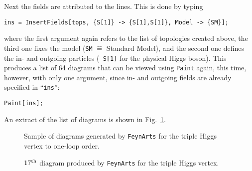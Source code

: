 Next the fields are attributed to the lines. This is done by typing
\begin{verbatim}
ins = InsertFields[tops, {S[1]} -> {S[1],S[1]}, Model -> {SM}];
\end{verbatim}
where the first argument again refers to the list of topologies created
above, the third one fixes the model ({\tt SM} $\widehat =$ Standard
Model), and the second one defines the in- and outgoing particles ({\tt
  S[1]} for the physical Higgs boson).  This produces a list of 64
diagrams that can be viewed using {\tt Paint} again, this time, however,
with only one argument, since in- and outgoing fields are already
specified in ``{\tt ins}'':
\begin{verbatim}
Paint[ins];
\end{verbatim}
An extract of the list of diagrams is shown in Fig.~\ref{FAHHH.ps}.
%
\begin{figure}[ht]
  \begin{center}
    \leavevmode
    \hfill
    \parbox{\captionwidth}{
    \caption[]{\label{FAHHH.ps}\sloppy
      Sample of diagrams generated by {\tt FeynArts} for the triple Higgs
      vertex to one-loop order.
      }}
  \end{center}
\end{figure}
%
%
\begin{figure}
  \begin{center}
    \leavevmode
    \hfill
    \parbox{\captionwidth}{
    \caption[]{\label{fig:fa:17}\sloppy
      $17^{\rm th}$ diagram produced by {\tt FeynArts} for the
      triple Higgs vertex.
      }}
  \end{center}
\end{figure}
%

